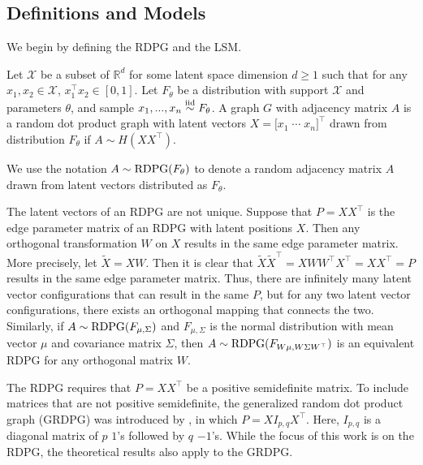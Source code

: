 \documentclass[12pt]{article}
\begin{document}
\hypertarget{definitions-and-models}{%
\subsection{Definitions and Models}\label{definitions-and-models}}

We begin by defining the RDPG and the LSM.

\begin{definition}
\label{def:rdpg}
Let $\mathcal{X}$ be a subset of $\mathbb{R}^d$ for some latent space dimension $d \geq 1$ such that for any $x_1, x_2 \in \mathcal{X}$, $x_1^\top x_2 \in [0, 1]$. 
Let $F_\theta$ be a distribution with support $\mathcal{X}$ and parameters $\theta$, and sample $x_1, ..., x_n \stackrel{\mathrm{iid}}{\sim} F_\theta$. 
A graph $G$ with adjacency matrix $A$ is a random dot product graph with latent vectors $X = \bigl[x_1 \; \cdots \; x_n\bigr]^\top$ drawn from distribution $F_\theta$ if $A \sim H(X X^\top)$. 

We use the notation $A \sim \mathrm{RDPG}(F_\theta)$ to denote a random adjacency matrix $A$ drawn from latent vectors distributed as $F_\theta$. 
\end{definition}

\begin{remark}
\label{remark:nonunique}
The latent vectors of an RDPG are not unique. 
Suppose that $P = X X^\top$ is the edge parameter matrix of an RDPG with latent positions $X$. 
Then any orthogonal transformation $W$ on $X$ results in the same edge parameter matrix. 
More precisely, let $\tilde{X} = X W$. 
Then it is clear that $\tilde{X} \tilde{X}^\top = X W W^\top X^\top = X X^\top = P$ results in the same edge parameter matrix. 
Thus, there are infinitely many latent vector configurations that can result in the same $P$, but for any two latent vector configurations, there exists an orthogonal mapping that connects the two. 
Similarly, if $A \sim \mathrm{RDPG}(F_{\mu, \Sigma})$ and $F_{\mu, \Sigma}$ is the normal distribution with mean vector $\mu$ and covariance matrix $\Sigma$, then $A \sim \mathrm{RDPG}(F_{W \mu, W \Sigma W^\top})$ is an equivalent RDPG for any orthogonal matrix $W$. 
\end{remark}

\begin{remark}
\label{remark:grdpg}
The RDPG requires that $P = X X^\top$ be a positive semidefinite matrix. 
To include matrices that are not positive semidefinite, the generalized random dot product graph (GRDPG) was introduced by \citet{rubindelanchy2017statistical}, in which $P = X I_{p,q} X^\top$. 
Here, $I_{p,q}$ is a diagonal matrix of $p$ $1$'s followed by $q$ $-1$'s. 
While the focus of this work is on the RDPG, the theoretical results also apply to the GRDPG. 
\end{remark}
\end{document}
